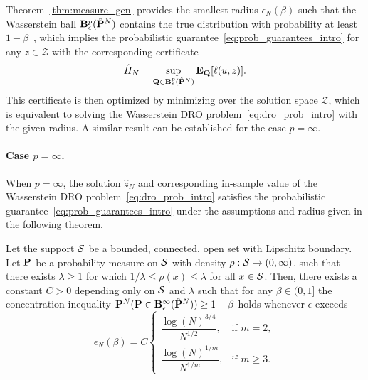 Theorem~\ref{thm:measure_gen} provides the smallest radius $\epsilon_N(\beta)$ such that the Wasserstein ball $\mathbf{B}_{{\epsilon}}^{p}(\hat{{\mathbf P}}^N)$ contains the true distribution with probability at least $1 - \beta$~\citep[Theorem 3.5]{mohajerin_esfahani_data-driven_2018}, which implies the probabilistic guarantee~\eqref{eq:prob_guarantees_intro} for any $z \in \mathcal{Z}$ with the corresponding certificate
$$\hat{H}_N = \sup_{\mathbf{Q} \in  \mathbf{B}_{{\epsilon}}^{p}(\hat{{\mathbf P}}^N)}\mathbf{E}_{\mathbf{Q}}[\ell(u,z)]. $$
This certificate is then optimized by minimizing over the solution space $\mathcal{Z}$, which is equivalent to solving the Wasserstein \gls{DRO} problem~\eqref{eq:dro_prob_intro} with the given radius.
A similar result can be established for the case $p = \infty$.

\paragraph{Case $p = \infty$.} When $p = \infty$, the solution $\hat{z}_N$ and corresponding in-sample value of the Wasserstein \gls {DRO} problem~\eqref{eq:dro_prob_intro} satisfies the probabilistic guarantee~\eqref{eq:prob_guarantees_intro} under the assumptions and radius given in the following theorem.
\begin{theorem}[Concentration inequalities, ${p = \infty}$ {\cite[Theorem 1.1]{wass-p-guarantee}}]
\label{theorem-inf}
	Let the support $\mathcal{S}$ be a bounded, connected, open set with Lipschitz boundary.
	Let ${\mathbf P}$ be a probability measure on $\mathcal{S}$ with density $\rho : \mathcal{S} \rightarrow (0,\infty)$, such that there exists $\lambda \geq 1$ for which ${1/\lambda \leq \rho(x) \leq \lambda}$ for all $x \in \mathcal{S}$.
	Then, there exists a constant $C > 0$ depending only on $\mathcal{S}$ and $\lambda$ such that for any $\beta \in (0,1]$ the concentration inequality ${\mathbf P}^N({\mathbf P} \in \mathbf{B}_{\epsilon}^{\infty}(\hat{{\mathbf P}}^N)) \geq 1 - \beta$ holds whenever $\epsilon$ exceeds
	\begin{equation}
	\label{eq:eps_N_inf}
		\epsilon_N(\beta) = C
		\begin{cases}
			\dfrac{\log(N)^{3/4}}{N^{1/2}}, & \text{if } m = 2, \\[6pt]
			\dfrac{\log(N)^{1/m}}{N^{1/m}}, & \text{if } m \geq 3.
		\end{cases}
	\end{equation}
\end{theorem}

